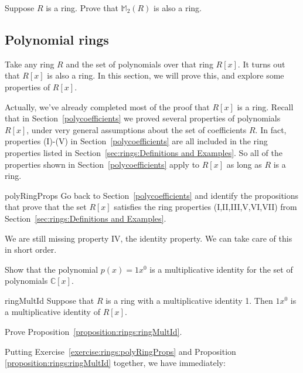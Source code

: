 \begin{exercise}{}
Suppose $R$ is a ring. Prove that  ${\mathbb M}_2(R)$ is also a ring.
\end{exercise}


\subsection{Polynomial  rings}\label{sec:polynomialRings}

Take any ring $R$ and the set of polynomials over that ring $R[x]$.  It turns out that $R[x]$ is also a ring.  In this section, we will prove this, and explore some properties of $R[x]$. 

Actually, we've already completed most of the proof that $R[x]$ is a ring. Recall that in Section~\ref{polycoefficients} we proved several properties of polynomials $R[x]$, under very general assumptions about the set of coefficients $R$.  In fact, properties (I)-(V) in Section~\ref{polycoefficients} are all included in the ring properties listed in Section~\ref{sec:rings:Definitions and Examples}. So all of the properties shown in Section~\ref{polycoefficients} apply to $R[x]$ as long as $R$ is a ring.

\begin{exercise}{polyRingProps}
Go back to Section~\ref{polycoefficients} and identify the propositions that prove that the set $R[x]$ satisfies the ring properties (I,II,III,V,VI,VII) from Section~\ref{sec:rings:Definitions and Examples}.
\end{exercise}

We are still missing property IV, the identity property. We can take care of this in short order.

\begin{exercise}{}
Show that the polynomial $p(x) = 1x^0$ is a multiplicative identity for the set of polynomials $\mathbb{C}[x]$.
\end{exercise}

\begin{prop}{ringMultId}
Suppose that $R$ is a ring with a multiplicative identity 1. Then $1x^0$ is a multiplicative identity of $R[x]$.
\end{prop}

\begin{exercise}{}
Prove Proposition~\ref{proposition:rings:ringMultId}.
\end{exercise}

Putting Exercise~\ref{exercise:rings:polyRingProps} and Proposition \ref{proposition:rings:ringMultId} together, we have immediately:

